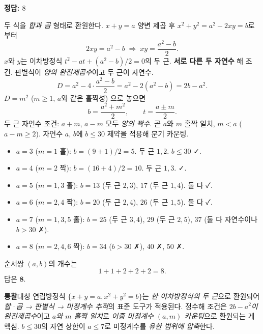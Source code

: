 \documentclass[10pt]{article}
\newcommand{\solnote}[1]{\par\smallskip\noindent
  \begin{tcolorbox}[enhanced, breakable, colback=vB-light, colframe=vB-light,
    boxrule=0pt, arc=3pt, left=10pt, right=10pt, top=4pt, bottom=4pt,
    fontupper=\sffamily\footnotesize\color{vB-ink}]
    \textbf{\color{vB-deep}통찰}\quad #1
  \end{tcolorbox}}
\begin{document}
\begin{answerbox}\sffamily\bfseries 정답: $8$\end{answerbox}
 두 식을 \emph{합과 곱} 형태로 환원한다. $x + y = a$ 양변 제곱 후 $x^2 + y^2 = a^2 - 2xy = b$로부터
\[ 2xy = a^2 - b \;\Longrightarrow\; xy = \frac{a^2 - b}{2}. \]
 $x$와 $y$는 이차방정식 $t^2 - at + (a^2 - b)/2 = 0$의 두 근.
 \textbf{서로 다른 두 자연수} 해 조건. 판별식이 \emph{양의 완전제곱수}이고 두 근이 자연수.
\[ D = a^2 - 4 \cdot \frac{a^2 - b}{2} = a^2 - 2(a^2 - b) = 2b - a^2. \]
$D = m^2$ ($m \ge 1$, $a$와 같은 홀짝성) 으로 놓으면
\[ b = \frac{a^2 + m^2}{2}, \qquad t = \frac{a \pm m}{2}. \]
 두 근 자연수 조건: $a + m$, $a - m$ 모두 \emph{양의 짝수}. 곧 $a$와 $m$ 홀짝 일치, $m < a$ ($a - m \ge 2$).
 자연수 $a$, $b$에 $b \le 30$ 제약을 적용해 분기 카운팅.
\begin{itemize}\setlength{\itemsep}{0pt}
\item $a = 3$ ($m = 1$ 홀): $b = (9 + 1)/2 = 5$. 두 근 $1, 2$. $b \le 30$ ✓.
\item $a = 4$ ($m = 2$ 짝): $b = (16 + 4)/2 = 10$. 두 근 $1, 3$. ✓.
\item $a = 5$ ($m = 1, 3$ 홀): $b = 13$ (두 근 $2, 3$), $17$ (두 근 $1, 4$). 둘 다 ✓.
\item $a = 6$ ($m = 2, 4$ 짝): $b = 20$ (두 근 $2, 4$), $26$ (두 근 $1, 5$). 둘 다 ✓.
\item $a = 7$ ($m = 1, 3, 5$ 홀): $b = 25$ (두 근 $3, 4$), $29$ (두 근 $2, 5$), $37$ (둘 다 자연수이나 $b > 30$ ✗).
\item $a = 8$ ($m = 2, 4, 6$ 짝): $b = 34$ ($b > 30$ ✗), $40$ ✗, $50$ ✗.
\end{itemize}
 순서쌍 $(a, b)$의 개수는
\[ 1 + 1 + 2 + 2 + 2 = 8. \]
답은 $\textbf{8}$.
\solnote{대칭 연립방정식 $\{x + y = a, x^2 + y^2 = b\}$는 \emph{한 이차방정식의 두 근}으로 환원되어 \emph{합·곱 → 판별식 → 미정계수 추적}의 표준 도구가 적용된다. 정수해 조건은 \emph{$2b - a^2$이 완전제곱수}이고 \emph{$a$와 $m$ 홀짝 일치}로 \emph{이중 미정계수 $(a, m)$ 카운팅}으로 환원되는 게 핵심. $b \le 30$의 자연 상한이 $a \le 7$로 미정계수를 \emph{유한 범위에 압축}한다.}
\end{document}
